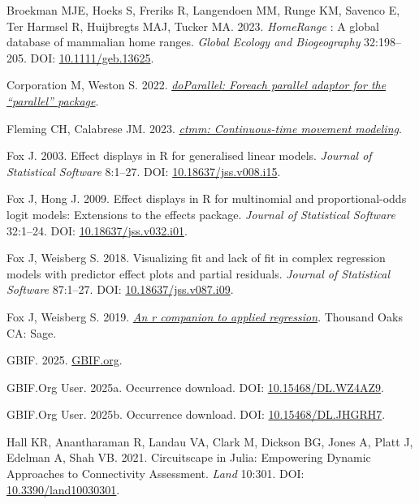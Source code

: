 \documentclass[10pt,a4paper]{article}
\newlength{\cslhangindent}
\newenvironment{CSLReferences}[2] %
 {\begin{list}{}{%
  \setlength{\itemindent}{0pt}
  \setlength{\leftmargin}{0pt}
  \setlength{\parsep}{0pt}
  \ifodd #1
   \setlength{\leftmargin}{\cslhangindent}
   \setlength{\itemindent}{-1\cslhangindent}
  \fi
  \setlength{\itemsep}{#2\baselineskip}}}
 {\end{list}}
\begin{document}
\begin{CSLReferences}{1}{0}
Broekman MJE, Hoeks S, Freriks R, Langendoen MM, Runge KM, Savenco E, Ter Harmsel R, Huijbregts MAJ, Tucker MA. 2023. \emph{HomeRange} : {A} global database of mammalian home ranges. \emph{Global Ecology and Biogeography} 32:198--205. DOI: \href{https://doi.org/10.1111/geb.13625}{10.1111/geb.13625}.

Corporation M, Weston S. 2022. \emph{\href{https://CRAN.R-project.org/package=doParallel}{{doParallel}: Foreach parallel adaptor for the {``{parallel}''} package}}.

Fleming CH, Calabrese JM. 2023. \emph{\href{https://CRAN.R-project.org/package=ctmm}{{ctmm}: Continuous-time movement modeling}}.

Fox J. 2003. Effect displays in {R} for generalised linear models. \emph{Journal of Statistical Software} 8:1--27. DOI: \href{https://doi.org/10.18637/jss.v008.i15}{10.18637/jss.v008.i15}.

Fox J, Hong J. 2009. Effect displays in {R} for multinomial and proportional-odds logit models: Extensions to the {effects} package. \emph{Journal of Statistical Software} 32:1--24. DOI: \href{https://doi.org/10.18637/jss.v032.i01}{10.18637/jss.v032.i01}.

Fox J, Weisberg S. 2018. Visualizing fit and lack of fit in complex regression models with predictor effect plots and partial residuals. \emph{Journal of Statistical Software} 87:1--27. DOI: \href{https://doi.org/10.18637/jss.v087.i09}{10.18637/jss.v087.i09}.

Fox J, Weisberg S. 2019. \emph{\href{https://socialsciences.mcmaster.ca/jfox/Books/Companion/index.html}{An r companion to applied regression}}. Thousand Oaks CA: Sage.

GBIF. 2025. \href{https://www.gbif.org}{{GBIF}.org}.

GBIF.Org User. 2025a. Occurrence download. DOI: \href{https://doi.org/10.15468/DL.WZ4AZ9}{10.15468/DL.WZ4AZ9}.

GBIF.Org User. 2025b. Occurrence download. DOI: \href{https://doi.org/10.15468/DL.JHGRH7}{10.15468/DL.JHGRH7}.

Hall KR, Anantharaman R, Landau VA, Clark M, Dickson BG, Jones A, Platt J, Edelman A, Shah VB. 2021. Circuitscape in {Julia}: {Empowering} {Dynamic} {Approaches} to {Connectivity} {Assessment}. \emph{Land} 10:301. DOI: \href{https://doi.org/10.3390/land10030301}{10.3390/land10030301}.


\end{CSLReferences}
\end{document}
